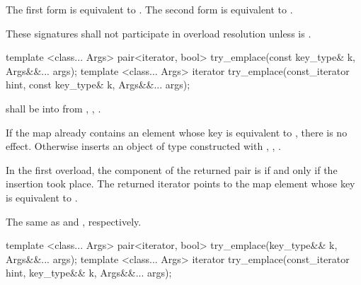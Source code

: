 \begin{itemdescr}
\pnum
\effects
The first form is equivalent to 
. The second form is
equivalent to .

\pnum
\remarks
These signatures shall not participate in overload resolution
unless  is
.
\end{itemdescr}

%
%
\begin{itemdecl}
template <class... Args> pair<iterator, bool> try_emplace(const key_type& k, Args&&... args);
template <class... Args> iterator try_emplace(const_iterator hint, const key_type& k, Args&&... args);
\end{itemdecl}

\begin{itemdescr}
\pnum
\requires
{} shall be  into 
from , ,
.

\pnum
\effects
If the map already contains an element
whose key is equivalent to ,
there is no effect.
Otherwise inserts an object of type 
constructed with , ,
.

\pnum
\returns
In the first overload,
the  component of the returned pair is 
if and only if the insertion took place.
The returned iterator points to the map element
whose key is equivalent to .

\pnum
\complexity
The same as  and ,
respectively.
\end{itemdescr}

%
%
\begin{itemdecl}
template <class... Args> pair<iterator, bool> try_emplace(key_type&& k, Args&&... args);
template <class... Args> iterator try_emplace(const_iterator hint, key_type&& k, Args&&... args);
\end{itemdecl}

